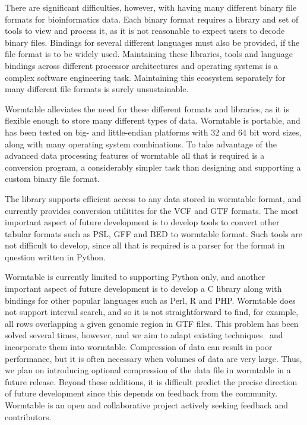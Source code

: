 \documentclass[10pt]{bmc_article}
\newenvironment{bmcformat}{\begin{raggedright}\baselineskip20pt\sloppy\setboolean{publ}{false}}{\end{raggedright}\baselineskip20pt\sloppy}
\begin{document}
\begin{bmcformat}
There are significant difficulties,
however, with having many different binary file formats for bioinformatics 
data. Each binary format requires a library and set of tools to view 
and process it, as it is not reasonable to expect users to decode binary
files. Bindings for several different languages must also be provided, if 
the file format is to be widely used.
Maintaining these libraries, tools and language bindings across 
different processor architectures and operating systems
is a complex software engineering task. Maintaining this ecosystem 
separately for many different file formats is surely 
unsustainable.

Wormtable alleviates the need for these different formats and libraries,
as it is flexible enough to store many different types of data. 
Wormtable is portable,
and has been tested on big- and little-endian platforms with 32 and 64
bit word sizes, along with many operating system combinations. To 
take advantage of the advanced data processing features of wormtable
all that is required is a conversion program, a considerably simpler
task than designing and supporting a custom binary file format.

The library supports efficient access to any data stored in 
wormtable format, and currently provides conversion utilitites 
for the VCF and GTF formats.
The most important aspect of future development 
is to develop tools to convert other tabular formats such as 
PSL, GFF and BED to wormtable format. 
Such tools are 
not difficult to develop, since all that is required is a parser
for the format in question written in Python.

Wormtable is currently limited to supporting Python only, and 
another important aspect of future development is to 
develop a C library along with bindings for other popular
languages such as Perl, R and PHP. 
Wormtable does not support interval search, and so it is not
straightforward to find, for example, all rows overlapping 
a given genomic region in GTF files. 
This problem has been 
solved several times, however, and we aim to adapt existing 
techniques~\cite{li11,kzbhk10} and incorporate them into 
wormtable.  Compression of data can
result in poor performance, but it is often necessary when 
volumes of data are very large. Thus, we plan on introducing 
optional compression of the data file in wormtable in 
a future release. Beyond these additions, it is difficult
predict the precise direction of future development since this depends 
on feedback from the community.  Wormtable is an open and 
collaborative project actively seeking feedback and 
contributors.



\end{bmcformat}
\end{document}
